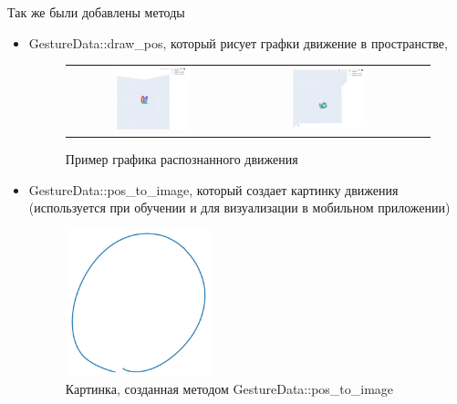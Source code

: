 Так же были добавлены методы
\begin{itemize}
  \item GestureData::draw\_pos, который рисует графки движение в пространстве,
  \begin{figure}[H]
    \begin{center}
        \begin{tabular}{ccc}
            \includegraphics[width=0.45\textwidth]{images/draw_pos_1.png} & 
            \includegraphics[width=0.45\textwidth]{images/draw_pos_2.png} \\
        \end{tabular}
    \end{center}
    \caption{Пример графика распознанного движения}
\end{figure}
  \item GestureData::pos\_to\_image, который создает картинку движения (используется при обучении и для визуализации в мобильном приложении)
  \begin{figure}[H]
    \begin{center}
        \includegraphics[width=0.4\textwidth]{images/pos_to_img_1.png}
    \end{center}
    \caption{Картинка, созданная методом GestureData::pos\_to\_image}
  \end{figure}
\end{itemize}

